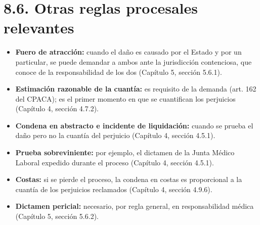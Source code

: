 \section{8.6. Otras reglas procesales relevantes}
\begin{itemize}
\item \textbf{Fuero de atracción:} cuando el daño es causado por el Estado y por un particular, se puede demandar a ambos ante la jurisdicción contenciosa, que conoce de la responsabilidad de los dos (Capítulo 5, sección 5.6.1).
\item \textbf{Estimación razonable de la cuantía:} es requisito de la demanda (art. 162 del CPACA); es el primer momento en que se cuantifican los perjuicios (Capítulo 4, sección 4.7.2).
\item \textbf{Condena en abstracto e incidente de liquidación:} cuando se prueba el daño pero no la cuantía del perjuicio (Capítulo 4, sección 4.5.1).
\item \textbf{Prueba sobreviniente:} por ejemplo, el dictamen de la Junta Médico Laboral expedido durante el proceso (Capítulo 4, sección 4.5.1).
\item \textbf{Costas:} si se pierde el proceso, la condena en costas es proporcional a la cuantía de los perjuicios reclamados (Capítulo 4, sección 4.9.6).
\item \textbf{Dictamen pericial:} necesario, por regla general, en responsabilidad médica (Capítulo 5, sección 5.6.2).
\end{itemize}
